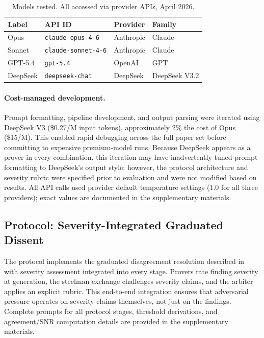 \documentclass[11pt]{article}
\begin{document}
\begin{table}[h]
\centering
\caption{Models tested. All accessed via provider APIs, April 2026.}
\label{tab:models}
\begin{tabular}{llll}
\toprule
\textbf{Label} & \textbf{API ID} & \textbf{Provider} & \textbf{Family} \\
\midrule
Opus & \texttt{claude-opus-4-6} & Anthropic & Claude \\
Sonnet & \texttt{claude-sonnet-4-6} & Anthropic & Claude \\
GPT-5.4 & \texttt{gpt-5.4} & OpenAI & GPT \\
DeepSeek & \texttt{deepseek-chat} & DeepSeek & DeepSeek V3.2 \\
\bottomrule
\end{tabular}
\end{table}

\paragraph{Cost-managed development.} Prompt formatting, pipeline development, and output parsing were iterated using DeepSeek V3 (\$0.27/M input tokens), approximately 2\% the cost of Opus (\$15/M). This enabled rapid debugging across the full paper set before committing to expensive premium-model runs. Because DeepSeek appears as a prover in every combination, this iteration may have inadvertently tuned prompt formatting to DeepSeek's output style; however, the protocol architecture and severity rubric were specified prior to evaluation and were not modified based on results. All API calls used provider default temperature settings (1.0 for all three providers); exact values are documented in the supplementary materials.

\subsection{Protocol: Severity-Integrated Graduated Dissent}
\label{sec:protocol}

The protocol implements the graduated disagreement resolution described in~\cite{brilliant2026graduated} with severity assessment integrated into every stage. Provers rate finding severity at generation, the steelman exchange challenges severity claims, and the arbiter applies an explicit rubric. This end-to-end integration ensures that adversarial pressure operates on severity claims themselves, not just on the findings. Complete prompts for all protocol stages, threshold derivations, and agreement/SNR computation details are provided in the supplementary materials.
\end{document}
